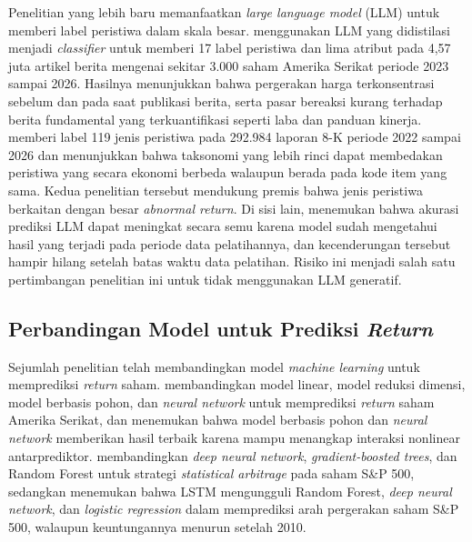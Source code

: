 Penelitian yang lebih baru memanfaatkan \emph{large language model} (LLM) untuk memberi label peristiwa dalam skala besar. \textcite{kargarzadeh2026} menggunakan LLM yang didistilasi menjadi \emph{classifier} untuk memberi 17 label peristiwa dan lima atribut pada 4,57 juta artikel berita mengenai sekitar 3.000 saham Amerika Serikat periode 2023 sampai 2026. Hasilnya menunjukkan bahwa pergerakan harga terkonsentrasi sebelum dan pada saat publikasi berita, serta pasar bereaksi kurang terhadap berita fundamental yang terkuantifikasi seperti laba dan panduan kinerja. \textcite{dolphin2026} memberi label 119 jenis peristiwa pada 292.984 laporan 8-K periode 2022 sampai 2026 dan menunjukkan bahwa taksonomi yang lebih rinci dapat membedakan peristiwa yang secara ekonomi berbeda walaupun berada pada kode item yang sama. Kedua penelitian tersebut mendukung premis bahwa jenis peristiwa berkaitan dengan besar \emph{abnormal return}. Di sisi lain, \textcite{gao2025} menemukan bahwa akurasi prediksi LLM dapat meningkat secara semu karena model sudah mengetahui hasil yang terjadi pada periode data pelatihannya, dan kecenderungan tersebut hampir hilang setelah batas waktu data pelatihan. Risiko ini menjadi salah satu pertimbangan penelitian ini untuk tidak menggunakan LLM generatif.

\subsection{Perbandingan Model untuk Prediksi \emph{Return}}

Sejumlah penelitian telah membandingkan model \emph{machine learning} untuk memprediksi \emph{return} saham. \textcite{gu2020} membandingkan model linear, model reduksi dimensi, model berbasis pohon, dan \emph{neural network} untuk memprediksi \emph{return} saham Amerika Serikat, dan menemukan bahwa model berbasis pohon dan \emph{neural network} memberikan hasil terbaik karena mampu menangkap interaksi nonlinear antarprediktor. \textcite{krauss2017} membandingkan \emph{deep neural network}, \emph{gradient-boosted trees}, dan Random Forest untuk strategi \emph{statistical arbitrage} pada saham S\&P 500, sedangkan \textcite{fischer2018} menemukan bahwa LSTM mengungguli Random Forest, \emph{deep neural network}, dan \emph{logistic regression} dalam memprediksi arah pergerakan saham S\&P 500, walaupun keuntungannya menurun setelah 2010.

